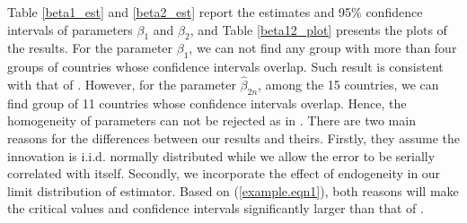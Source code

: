 \begin{table}[!ht]
\selectfont \caption{Estimates and 95\% Confidence Intervals of $\hat{\beta}_{1n}$ and $\hat{\beta}_{2n}$}
\label{beta12_plot} 
\end{table}

Table \ref{beta1_est} and \ref{beta2_est} report the estimates and 95\% confidence intervals of parameters $\beta_{1}$ and $\beta_{2}$, and Table \ref{beta12_plot} presents the plots of the results. For the parameter $\beta_{1}$, we can not find any group with more than four groups of countries whose confidence intervals overlap. Such result is consistent with that of \cite{piaggiopadilla2010}. However, for the parameter $\hat{\beta}_{2n}$, among the 15 countries, we can find group of 11 countries whose confidence intervals overlap. Hence, the homogeneity of parameters can not be rejected as in \cite{piaggiopadilla2010}. There are two main reasons for the  differences between our results and theirs. Firstly, they assume the innovation is i.i.d. normally distributed while we allow the error to be serially correlated with itself. Secondly, we incorporate the effect of endogeneity in our limit distribution of estimator. Based on (\ref{example.eqn1}), both reasons will make the critical values and confidence intervals significantly larger than that of \cite{piaggiopadilla2010}.


